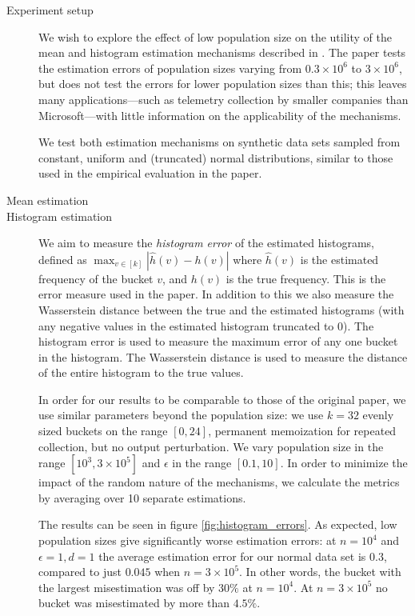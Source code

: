 \documentclass[12pt]{article}
\begin{document}
\begin{description}
    \item[Experiment setup] We wish to explore the effect of low population size on the utility of the mean and histogram estimation mechanisms described in \cite{microsoft_telemetry}. The paper tests the estimation errors of population sizes varying from $0.3\times10^6$ to $3\times10^6$, but does not test the errors for lower population sizes than this; this leaves many applications---such as telemetry collection by smaller companies than Microsoft---with little information on the applicability of the mechanisms.
    
    We test both estimation mechanisms on synthetic data sets sampled from constant, uniform and (truncated) normal distributions, similar to those used in the empirical evaluation in the paper.
    
    \item[Mean estimation]
    
    \item[Histogram estimation]
    We aim to measure the \emph{histogram error} of the estimated histograms, defined as $\max_{v\in[k]} |\hat{h}(v)-h(v)|$ where $\hat{h}(v)$ is the estimated frequency of the bucket $v$, and $h(v)$ is the true frequency. This is the error measure used in the paper. In addition to this we also measure the Wasserstein distance between the true and the estimated histograms (with any negative values in the estimated histogram truncated to 0). The histogram error is used to measure the maximum error of any one bucket in the histogram. The Wasserstein distance is used to measure the distance of the entire histogram to the true values.
    
    In order for our results to be comparable to those of the original paper, we use similar parameters beyond the population size: we use $k=32$ evenly sized buckets on the range $[0,24]$, permanent memoization for repeated collection, but no output perturbation. We vary population size in the range $[10^3, 3\times10^5]$ and $\epsilon$ in the range $[0.1, 10]$. In order to minimize the impact of the random nature of the mechanisms, we calculate the metrics by averaging over 10 separate estimations.
    
    The results can be seen in figure \ref{fig:histogram_errors}. As expected, low population sizes give significantly worse estimation errors: at $n=10^4$ and $\epsilon=1, d=1$ the average estimation error for our normal data set is $0.3$, compared to just $0.045$ when $n=3\times10^5$. In other words, the bucket with the largest misestimation was off by $30\%$ at $n=10^4$. At $n=3\times10^5$ no bucket was misestimated by more than $4.5\%$.
    

\end{description}
\end{document}
